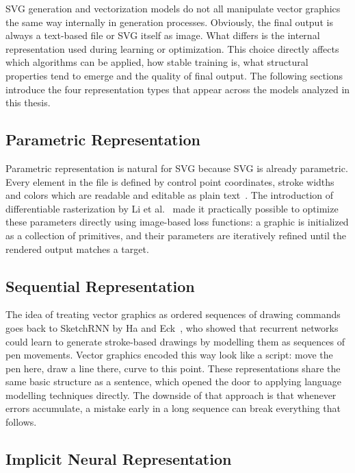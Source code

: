 SVG generation and vectorization models do not all manipulate 
vector graphics the same way internally in generation processes. Obviously, the final output is 
always a text-based file or SVG itself as image. What differs is the internal representation 
used during learning or optimization. This choice directly 
affects which algorithms can be applied, how stable training 
is, what structural properties tend to emerge and the quality of final output. 
The following sections introduce the four representation types 
that appear across the models analyzed in this thesis.

\subsection{Parametric Representation}
\label{sec:parametric_repr}

Parametric representation is natural for SVG because  
SVG is already parametric. Every element in the file is 
defined by control point coordinates, stroke 
widths and colors which are readable and editable as plain 
text~\cite{eisenbergSVGEssentialsProducing20}. The introduction 
of differentiable rasterization by Li et 
al.~\cite{liDifferentiableVectorGraphics2020a} made it practically possible 
to optimize these parameters directly using image-based loss 
functions: a graphic is initialized as a collection of 
primitives, and their parameters are iteratively refined until 
the rendered output matches a target.

\subsection{Sequential Representation}
\label{sec:sequential_repr}

The idea of treating vector graphics as ordered sequences of 
drawing commands goes back to SketchRNN by Ha and 
Eck~\cite{haNeuralRepresentationSketch2017}, who showed that 
recurrent networks could learn to generate stroke-based 
drawings by modelling them as sequences of pen movements. 
Vector graphics encoded this way look like a script: move the pen here,
draw a line there, curve to this point. These representations share the same basic 
structure as a sentence, which opened the door to applying 
language modelling techniques directly. The downside of that approach 
is that whenever errors accumulate, a mistake early in a long sequence can 
break everything that follows.

\subsection{Implicit Neural Representation}
\label{sec:implicit_repr}

